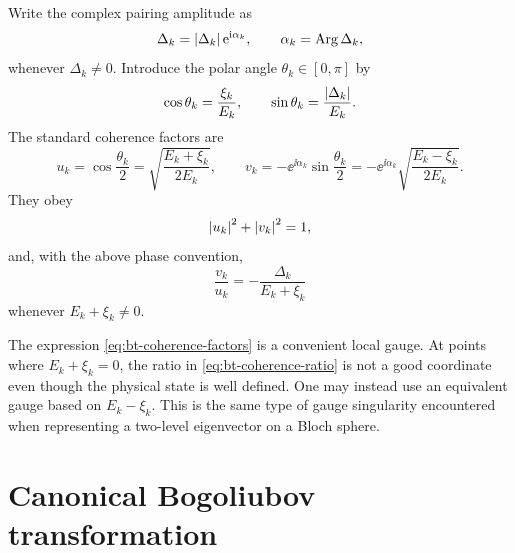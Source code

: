Write the complex pairing amplitude as
\begin{equation}
\label{eq:bt-gap-phase-definition}
    \Delta_k=\left|\Delta_k\right|\mathrm{e}^{\mathrm{i}\alpha_k},
    \qquad
    \alpha_k=\operatorname{Arg}\Delta_k,
\end{equation}
whenever $\Delta_k\neq0$.  Introduce the polar angle $\theta_k\in[0,\pi]$ by
\begin{equation}
\label{eq:bt-bogoliubov-angle}
    \cos\theta_k=\frac{\xi_k}{E_k},
    \qquad
    \sin\theta_k=\frac{\left|\Delta_k\right|}{E_k}.
\end{equation}
The standard coherence factors are
\begin{equation}
\label{eq:bt-coherence-factors}
    u_k=\cos\frac{\theta_k}{2}
    =\sqrt{\frac{E_k+\xi_k}{2E_k}},
    \qquad
    v_k=-\ee^{\ii\alpha_k}\sin\frac{\theta_k}{2}
    =-\ee^{\ii\alpha_k}\sqrt{\frac{E_k-\xi_k}{2E_k}}.
\end{equation}
They obey
\begin{equation}
\label{eq:bt-coherence-normalization}
    \left|u_k\right|^2+\left|v_k\right|^2=1,
\end{equation}
and, with the above phase convention,
\begin{equation}
\label{eq:bt-coherence-ratio}
    \frac{v_k}{u_k}
    =
    -\frac{\Delta_k}{E_k+\xi_k}
\end{equation}
whenever $E_k+\xi_k\neq0$.

\begin{remark}
The expression \cref{eq:bt-coherence-factors} is a convenient local gauge.  At
points where $E_k+\xi_k=0$, the ratio in \cref{eq:bt-coherence-ratio} is not a
good coordinate even though the physical state is well defined.  One may instead
use an equivalent gauge based on $E_k-\xi_k$.  This is the same type of gauge
singularity encountered when representing a two-level eigenvector on a Bloch
sphere.
\end{remark}

\section{Canonical Bogoliubov transformation}
\label{sec:bt-canonical-transformation}

